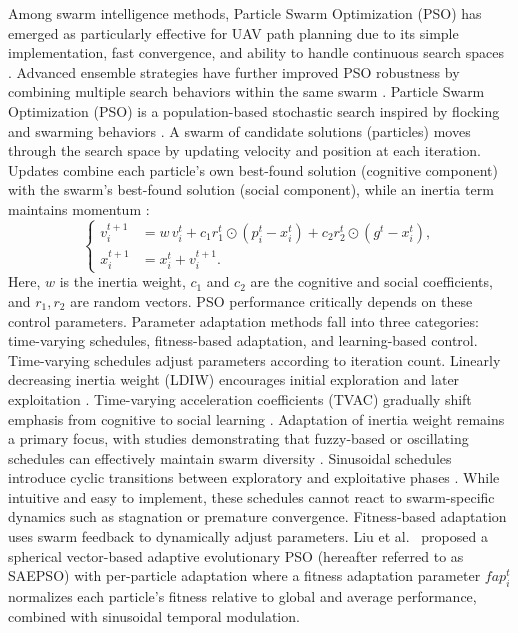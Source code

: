 \documentclass[final,5p,times]{elsarticle}
\begin{document}
Among swarm intelligence methods, Particle Swarm Optimization (PSO) has emerged as particularly effective for UAV path planning due to its simple implementation, fast convergence, and ability to handle continuous search spaces \cite{Cheng2024Research, Phung2021Safetyenhanced}.
Advanced ensemble strategies have further improved PSO robustness by combining multiple search behaviors within the same swarm \cite{Lynn2017Ensemble}. Particle Swarm Optimization (PSO) is a population-based stochastic search inspired by flocking and swarming behaviors \cite{Kennedy1995Particle}.
A swarm of candidate solutions (particles) moves through the search space by updating velocity and position at each iteration.
Updates combine each particle's own best-found solution (cognitive component) with the swarm's best-found solution (social component), while an inertia term maintains momentum \cite{Clerc2002The}:
\begin{equation}
\left\{
\begin{aligned}
v_i^{t+1} &= w\,v_i^{t} + c_1 r_1^{t}\odot(p_i^{t}-x_i^{t}) + c_2 r_2^{t}\odot(g^{t}-x_i^{t}),\\
x_i^{t+1} &= x_i^{t}+v_i^{t+1}.
\end{aligned}
\right.
\end{equation}
Here, \(w\) is the inertia weight, \(c_1\) and \(c_2\) are the cognitive and social coefficients, and \(r_1,r_2\) are random vectors.
PSO performance critically depends on these control parameters. Parameter adaptation methods fall into three categories: time-varying schedules, fitness-based adaptation, and learning-based control.
Time-varying schedules adjust parameters according to iteration count.
Linearly decreasing inertia weight (LDIW) encourages initial exploration and later exploitation \cite{Eberhart2000Comparing}.
Time-varying acceleration coefficients (TVAC) gradually shift emphasis from cognitive to social learning \cite{Ratnaweera2004Selforganizing}.
Adaptation of inertia weight remains a primary focus, with studies demonstrating that fuzzy-based or oscillating schedules can effectively maintain swarm diversity \cite{Nickabadi2011A}.
Sinusoidal schedules introduce cyclic transitions between exploratory and exploitative phases \cite{Kentzoglanakis2009Particle, Chen2018A}.
While intuitive and easy to implement, these schedules cannot react to swarm-specific dynamics such as stagnation or premature convergence. Fitness-based adaptation uses swarm feedback to dynamically adjust parameters.
Liu et al.\ \cite{Liu2025A} proposed a spherical vector-based adaptive evolutionary PSO (hereafter referred to as SAEPSO) with per-particle adaptation where a fitness adaptation parameter $fap_i^{t}$ normalizes each particle's fitness relative to global and average performance, combined with sinusoidal temporal modulation.
\end{document}
